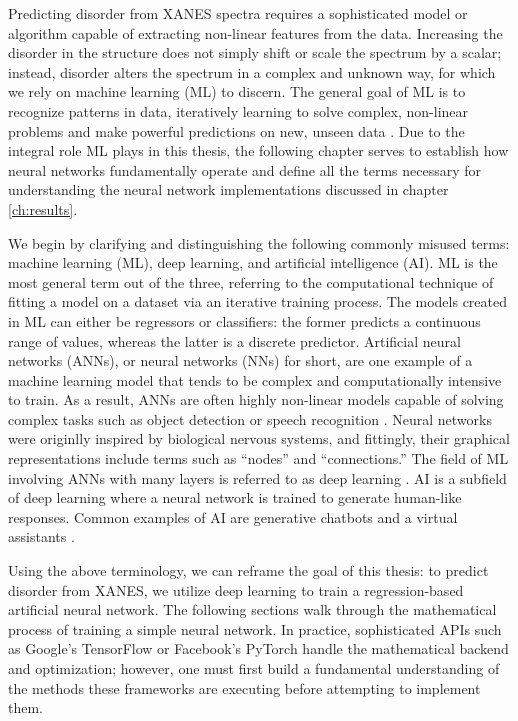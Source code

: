Predicting disorder from XANES spectra requires a sophisticated model or algorithm capable of extracting non-linear features from the data. Increasing the disorder in the structure does not simply shift or scale the spectrum by a scalar; instead, disorder alters the spectrum in a complex and unknown way, for which we rely on machine learning  (ML) to discern. The general goal of ML is to recognize patterns in data, iteratively learning to solve complex, non-linear problems and make powerful predictions on new, unseen data \cite{ML-and-the-physical-sci}. Due to the integral role ML plays in this thesis, the following chapter serves to establish how neural networks fundamentally operate and define all the terms necessary for understanding the neural network implementations discussed in chapter \ref{ch:results}.

We begin by clarifying and distinguishing the following commonly misused terms: machine learning (ML), deep learning, and artificial intelligence (AI). ML is the most general term out of the three, referring to the computational technique of fitting a model on a dataset via an iterative training process. The models created in ML can either be regressors or classifiers: the former predicts a continuous range of values, whereas the latter is a discrete predictor. Artificial neural networks (ANNs), or neural networks (NNs) for short, are one example of a machine learning model that tends to be complex and computationally intensive to train. As a result, ANNs are often highly non-linear models capable of solving complex tasks such as object detection \cite{szegedy2013deep} or speech recognition \cite{ms-speech-recognition-paper} \cite{speech-recognition}. Neural networks were originlly inspired by biological nervous systems, and fittingly, their graphical representations include terms such as ``nodes'' and ``connections.'' The field of ML involving ANNs with many layers is referred to as deep learning \cite{schmidhuber2015deep}. AI is a subfield of deep learning where a neural network is trained to generate human-like responses. Common examples of AI are generative chatbots \cite{chatbots} and a virtual assistants \cite{virtual-assistants} \cite{virtual-assistants2}. 

Using the above terminology, we can reframe the goal of this thesis: to predict disorder from XANES, we utilize deep learning to train a regression-based artificial neural network. The following sections walk through the mathematical process of training a simple neural network. In practice, sophisticated APIs such as Google's TensorFlow \cite{tensorflow2015-whitepaper} or Facebook's PyTorch \cite{pytorch-paper} handle the mathematical backend and optimization; however, one must first build a fundamental understanding of the methods these frameworks are executing before attempting to implement them.

